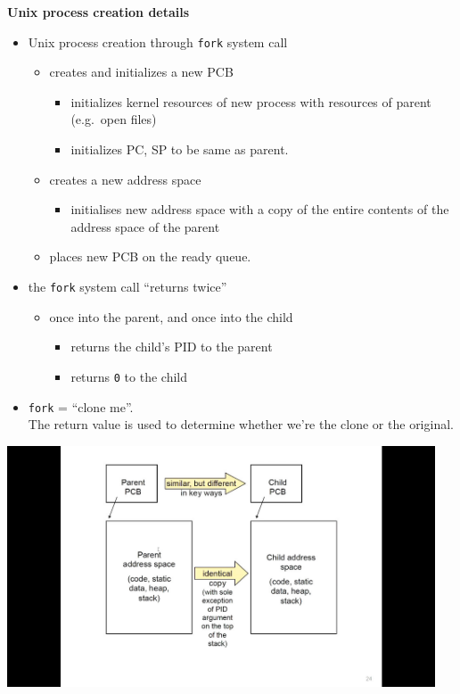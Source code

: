 \documentclass[11pt,a4paper]{article}
\begin{document}
\textbf{Unix process creation details}
\begin{itemize}
    \item Unix process creation through \texttt{fork} system call
        \begin{itemize}
            \item creates and initializes a new PCB
                \begin{itemize}
                    \item initializes kernel resources of new process with resources of parent
                        (e.g.\ open files)
                    \item initializes PC, SP to be same as parent.
                \end{itemize}
            \item creates a new address space
                \begin{itemize}
                    \item initialises new address space with a copy of the entire contents of
                        the address space of the parent
                \end{itemize}
            \item places new PCB on the ready queue.
        \end{itemize}
    \item the \texttt{fork} system call ``returns twice''
        \begin{itemize}
            \item once into the parent, and once into the child
                \begin{itemize}
                    \item returns the child's PID to the parent
                    \item returns \texttt{0} to the child
                \end{itemize}
        \end{itemize}
    \item \texttt{fork} = ``clone me''. \\
        The return value is used to determine whether we're the clone or the original.
\end{itemize}

\includegraphics[height=270]{fork.jpg}
\end{document}
